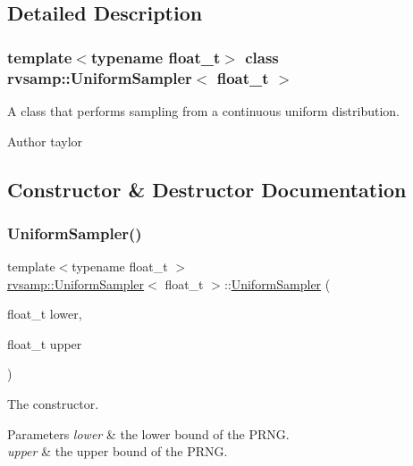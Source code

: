 \subsection{Detailed Description}
\subsubsection*{template$<$typename float\+\_\+t$>$\newline
class rvsamp\+::\+Uniform\+Sampler$<$ float\+\_\+t $>$}

A class that performs sampling from a continuous uniform distribution. 

\begin{DoxyAuthor}{Author}
taylor 
\end{DoxyAuthor}


\subsection{Constructor \& Destructor Documentation}
\mbox{\label{classrvsamp_1_1UniformSampler_a909a8202baf85b8b541d6e339c0e1b18}} 
\subsubsection{\texorpdfstring{Uniform\+Sampler()}{UniformSampler()}}
{\footnotesize\ttfamily template$<$typename float\+\_\+t $>$ \\
\hyperlink{classrvsamp_1_1UniformSampler}{rvsamp\+::\+Uniform\+Sampler}$<$ float\+\_\+t $>$\+::\hyperlink{classrvsamp_1_1UniformSampler}{Uniform\+Sampler} (\begin{DoxyParamCaption}\item[{float\+\_\+t}]{lower,  }\item[{float\+\_\+t}]{upper }\end{DoxyParamCaption})}



The constructor. 


\begin{DoxyParams}{Parameters}
{\em lower} & the lower bound of the P\+R\+NG. \\
\hline
{\em upper} & the upper bound of the P\+R\+NG. \\
\hline
\end{DoxyParams}


